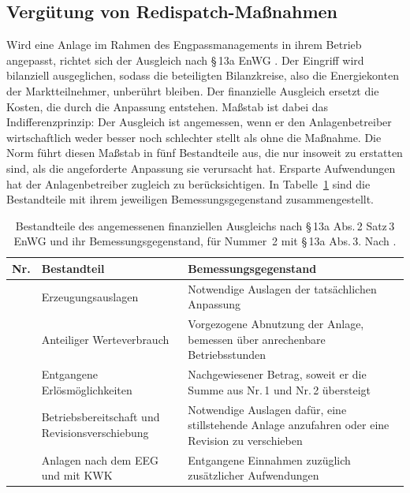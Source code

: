 \subsection{Vergütung von Redispatch-Maßnahmen}
\label{sec:redispatch_compensation}

Wird eine Anlage im Rahmen des Engpassmanagements in ihrem Betrieb angepasst, richtet sich der Ausgleich nach §\,13a \ac{EnWG} \cite{bundesministerium_der_justiz_energiewirtschaftsgesetz_2025}.
Der Eingriff wird bilanziell ausgeglichen, sodass die beteiligten Bilanzkreise, also die Energiekonten der Marktteilnehmer, unberührt bleiben.
Der finanzielle Ausgleich ersetzt die Kosten, die durch die Anpassung entstehen.
Maßstab ist dabei das Indifferenzprinzip: Der Ausgleich ist angemessen, wenn er den Anlagenbetreiber wirtschaftlich weder besser noch schlechter stellt als ohne die Maßnahme.
Die Norm führt diesen Maßstab in fünf Bestandteile aus, die nur insoweit zu erstatten sind, als die angeforderte Anpassung sie verursacht hat.
Ersparte Aufwendungen hat der Anlagenbetreiber zugleich zu berücksichtigen.
In Tabelle~\ref{tab:ausgleich_bestandteile} sind die Bestandteile mit ihrem jeweiligen Bemessungsgegenstand zusammengestellt.

\begin{table}[htbp]
    \centering
    \caption{Bestandteile des angemessenen finanziellen Ausgleichs nach §\,13a Abs.\,2 Satz\,3 \ac{EnWG} und ihr Bemessungsgegenstand, für Nummer~2 mit §\,13a Abs.\,3. Nach \cite{bundesministerium_der_justiz_energiewirtschaftsgesetz_2025}.}
    \label{tab:ausgleich_bestandteile}
    \small
    \begin{tabular}{@{}>{\raggedright\arraybackslash}p{}>{\raggedright\arraybackslash}p{}>{\raggedright\arraybackslash}p{}@{}}
        \hline
        \textbf{Nr.} & \textbf{Bestandteil} & \textbf{Bemessungsgegenstand} \\
        \hline
        1 & Erzeugungsauslagen & Notwendige Auslagen der tatsächlichen Anpassung \\
        \hline
        2 & Anteiliger Werteverbrauch & Vorgezogene Abnutzung der Anlage, bemessen über anrechenbare Betriebsstunden \\
        \hline
        3 & Entgangene Erlösmöglichkeiten & Nachgewiesener Betrag, soweit er die Summe aus Nr.\,1 und Nr.\,2 übersteigt \\
        \hline
        4 & Betriebsbereitschaft und Revisionsverschiebung & Notwendige Auslagen dafür, eine stillstehende Anlage anzufahren oder eine Revision zu verschieben \\
        \hline
        5 & Anlagen nach dem \acs{EEG} und mit \acs{KWK} & Entgangene Einnahmen zuzüglich zusätzlicher Aufwendungen \\
        \hline
    \end{tabular}
\end{table}


